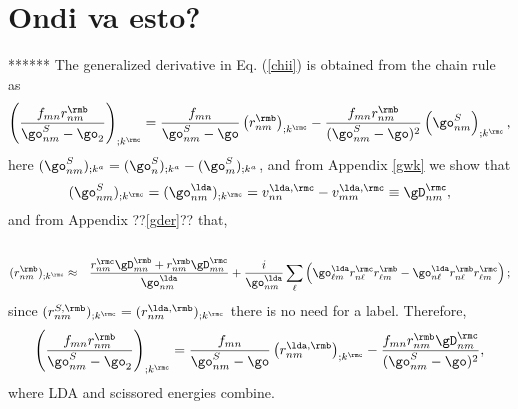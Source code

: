 \section{Ondi va esto?}
******
The generalized derivative
in Eq. (\ref{chii}) is obtained from the chain rule as
\begin{equation}\label{gene}
\left(\frac{f_{mn}r_{nm}^{\rmb}}{\go^S_{nm}-\go_2}\right)_{;k^{\rmc}}=
\frac{f_{mn}}{\go^S_{nm}-\go}\left(r_{nm}^{\rmb}\right)_{;k^{\rmc}}
-\frac{f_{mn}r_{nm}^{\rmb}}{(\go^S_{nm}-\go)^2}\left(\go^S_{nm}\right)_{;k^{\rmc}},
\end{equation} 
here $(\go^S_{nm})_{;k^a}=(\go^S_{n})_{;k^a}-(\go^S_{m})_{;k^a}$, and 
from Appendix \ref{gwk} we show that 
\begin{equation}\label{wk}
(\go^S_{nm})_{;k^{\rmc}}=(\go^\lda_{nm})_{;k^{\rmc}}= 
v_{nn}^{\lda,\rmc}-v_{mm}^{\lda,\rmc}\equiv\gD_{nm}^{\rmc}
,
\end{equation} 
and from Appendix ??\ref{gder}?? that,\cite{nastosPRB05}
\begin{eqnarray}\label{rgk}
\nonumber\\
(r^\rmb_{nm})_{;k^{\rmc}}
&\approx&
\frac{r_{nm}^{\rmc}\gD_{mn}^{\rmb}+r_{nm}^{\rmb}\gD_{mn}^{\rmc}}{\go^\lda_{nm}}
+\frac{i}{\go^\lda_{nm}}\sum_\ell\left(\go^\lda_{\ell m}r_{n\ell}^{\rmc}r_{\ell m}^{\rmb}
-\go^\lda_{n \ell}r_{n\ell}^{\rmb}r_{\ell m}^{\rmc}\right);
\end{eqnarray} 
since
$(r^{S,\rmb}_{nm})_{;k^{\rmc}}
=
(r^{\lda,\rmb}_{nm})_{;k^{\rmc}}
$ there is no need for a label.
Therefore,
\begin{equation}\label{gene2}
\left(\frac{f_{mn}r_{nm}^{\rmb}}{\go^S_{nm}-\go_2}\right)_{;k^{\rmc}}=
\frac{f_{mn}}{\go^S_{nm}-\go}\left(r_{nm}^{\lda,\rmb}\right)_{;k^{\rmc}}
-\frac{f_{mn}r_{nm}^{\rmb}\gD_{nm}^\rmc}{(\go^S_{nm}-\go)^2}
,
\end{equation} 
where LDA and scissored energies combine.

